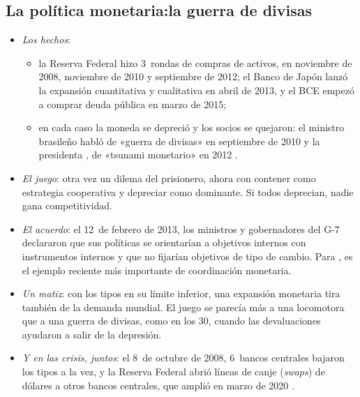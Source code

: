 \documentclass[11pt]{article}
\begin{document}
\subsection{La política monetaria:\cortetitulo la guerra de divisas}\label{sec:hist-monetaria}
\begin{itemize}
\item \emph{Los hechos}:
  \begin{itemize}
  \item la Reserva Federal hizo 3~rondas de compras de activos, en noviembre de 2008, noviembre de 2010 y septiembre de 2012\nocite{Fed2008QE,Fed2010FOMCnov,Fed2012FOMCsep}; el Banco de Japón lanzó la expansión cuantitativa y cualitativa en abril de 2013\nocite{BoJ2013QQE}, y el BCE empezó a comprar deuda pública en marzo de 2015\nocite{BCE2015APP};
  \item en cada caso la moneda se depreció y los socios se quejaron: el ministro brasileño  habló de «guerra de divisas» en septiembre de 2010 y la presidenta , de «tsunami monetario» en 2012\nocite{Frankel2016Coordination} .
  \end{itemize}
\item \emph{El juego}: otra vez un dilema del prisionero, ahora con contener como estrategia cooperativa y depreciar como dominante. Si todos deprecian, nadie gana competitividad.
\item \emph{El acuerdo}: el 12~de febrero de 2013, los ministros y gobernadores del G-7 declararon que sus políticas se orientarían a objetivos internos con instrumentos internos y que no fijarían objetivos de tipo de cambio\nocite{G72013Divisas}. Para \textcite{Frankel2016Coordination}, es el ejemplo reciente más importante de coordinación monetaria.
\item \emph{Un matiz}: con los tipos en su límite inferior, una expansión monetaria tira también de la demanda mundial. El juego se parecía más a una locomotora que a una guerra de divisas, como en los 30, cuando las devaluaciones ayudaron a salir de la depresión\nocite{EichengreenSachs1985,Frankel2016Coordination}.
\item \emph{Y en las crisis, juntos}: el 8~de octubre de 2008, 6~bancos centrales bajaron los tipos a la vez\nocite{FED2008Conjunta}, y la Reserva Federal abrió líneas de canje (\emph{swaps}) de dólares a otros bancos centrales, que amplió en marzo de 2020\nocite{Fed2020Swaps} .
\end{itemize}
\end{document}
